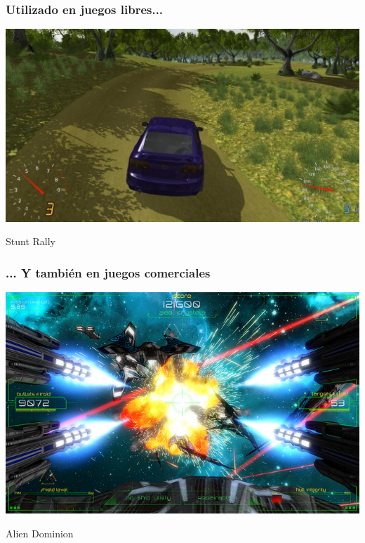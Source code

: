 \documentclass[green]{beamer}
\begin{document}
\begin{frame}
    \frametitle{Utilizado en juegos libres...}
    
    \begin{center}
	\includegraphics[scale=0.25]{img/stuntrally.jpg}
	    
	\tiny{Stunt Rally}
    \end{center}
\end{frame}

\begin{frame}
    \frametitle{... Y también en juegos comerciales}
    
    \begin{center}
	\includegraphics[scale=0.4]{img/aliendominion.jpg}
	    
	\tiny{Alien Dominion}
    \end{center}
\end{frame}
\end{document}
